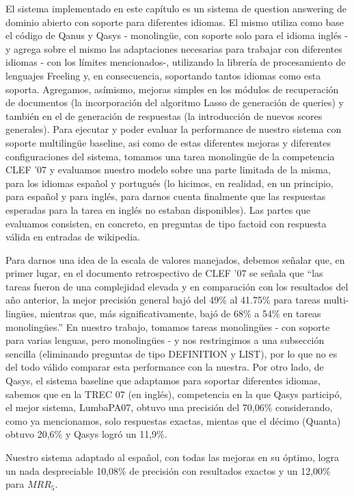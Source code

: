 El sistema implementado en este capítulo es un sistema de question answering de dominio abierto con soporte para diferentes idiomas. El mismo utiliza como base el código de Qanus y Qasys - monolingüe, con soporte solo para el idioma inglés - y agrega sobre el mismo las adaptaciones necesarias para trabajar con diferentes idiomas - con los límites mencionados-, utilizando la librería de procesamiento de lenguajes Freeling y, en consecuencia, soportando tantos idiomas como esta soporta. Agregamos, asímismo, mejoras simples en los módulos de recuperación de documentos (la incorporación del algoritmo Lasso de generación de queries) y también en el de generación de respuestas (la introducción de nuevos scores generales). Para ejecutar y poder evaluar la performance de nuestro sistema con soporte multilingüe baseline, asi como de estas diferentes mejoras y diferentes configuraciones del sistema, tomamos una tarea monolingüe de la competencia CLEF '07 y evaluamos nuestro modelo sobre una parte limitada de la misma, para los idiomas español y portugués (lo hicimos, en realidad, en un principio, para español y para inglés, para darnos cuenta finalmente que las respuestas esperadas para la tarea en inglés no estaban disponibles). Las partes que evaluamos consisten, en concreto, en preguntas de tipo factoid con respuesta válida en entradas de wikipedia.

Para darnos una idea de la escala de valores manejados, debemos señalar que, en primer lugar, en el documento retrospectivo de CLEF '07 se señala que ``las tareas fueron de una complejidad elevada y en comparación con los resultados del año anterior, la mejor precisión general bajó del 49\% al 41.75\% para tareas multi-lingües, mientras que, más significativamente, bajó de 68\% a 54\% en tareas monolingües.'' En nuestro trabajo, tomamos tareas monolingües - con soporte para varias lenguas, pero monolingües - y nos restringimos a una subsección sencilla (eliminando preguntas de tipo DEFINITION y LIST), por lo que no es del todo válido comparar esta performance con la nuestra. Por otro lado, de Qasys, el sistema baseline que adaptamos para soportar diferentes idiomas, sabemos que en la TREC 07 (en inglés), competencia en la que Qasys participó, el mejor sistema, LumbaPA07, obtuvo una precisión del 70,06\% considerando, como ya mencionamos, solo respuestas exactas, mientas que el décimo (Quanta) obtuvo 20,6\% y Qasys logró un 11,9\%.

Nuestro sistema adaptado al español, con todas las mejoras en su óptimo, logra un nada despreciable 10,08\% de precisión con resultados exactos y un 12,00\% para $MRR_5$.

